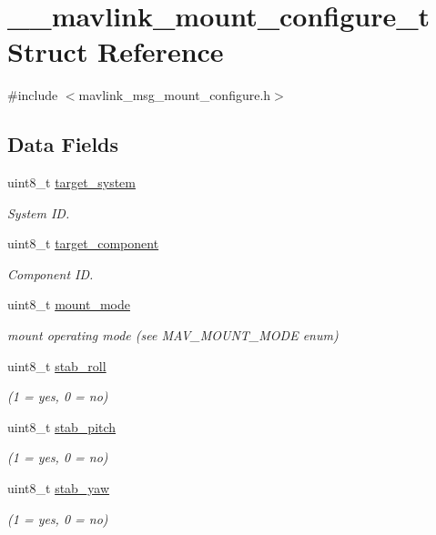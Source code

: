 \hypertarget{struct____mavlink__mount__configure__t}{\section{\+\_\+\+\_\+mavlink\+\_\+mount\+\_\+configure\+\_\+t Struct Reference}
\label{struct____mavlink__mount__configure__t}
}


{\ttfamily \#include $<$mavlink\+\_\+msg\+\_\+mount\+\_\+configure.\+h$>$}

\subsection*{Data Fields}
\begin{DoxyCompactItemize}
\item 
uint8\+\_\+t \hyperlink{struct____mavlink__mount__configure__t_a042d72066e81eccc6c32bc96d280a92a}{target\+\_\+system}
\begin{DoxyCompactList}\small\item\em System I\+D. \end{DoxyCompactList}\item 
uint8\+\_\+t \hyperlink{struct____mavlink__mount__configure__t_a30f5f09059b93600d2ef5579fa3305a0}{target\+\_\+component}
\begin{DoxyCompactList}\small\item\em Component I\+D. \end{DoxyCompactList}\item 
uint8\+\_\+t \hyperlink{struct____mavlink__mount__configure__t_a8b7219bf7b6959a8b1cf160ff8904d70}{mount\+\_\+mode}
\begin{DoxyCompactList}\small\item\em mount operating mode (see M\+A\+V\+\_\+\+M\+O\+U\+N\+T\+\_\+\+M\+O\+D\+E enum) \end{DoxyCompactList}\item 
uint8\+\_\+t \hyperlink{struct____mavlink__mount__configure__t_a4f6f48948adbb47cdbbbd0b8f8efe3c9}{stab\+\_\+roll}
\begin{DoxyCompactList}\small\item\em (1 = yes, 0 = no) \end{DoxyCompactList}\item 
uint8\+\_\+t \hyperlink{struct____mavlink__mount__configure__t_ab3e7a2d70a874b976851e2ee08a744ba}{stab\+\_\+pitch}
\begin{DoxyCompactList}\small\item\em (1 = yes, 0 = no) \end{DoxyCompactList}\item 
uint8\+\_\+t \hyperlink{struct____mavlink__mount__configure__t_a6cb35e89730214c425eb45d26b345783}{stab\+\_\+yaw}
\begin{DoxyCompactList}\small\item\em (1 = yes, 0 = no) \end{DoxyCompactList}\end{DoxyCompactItemize}


